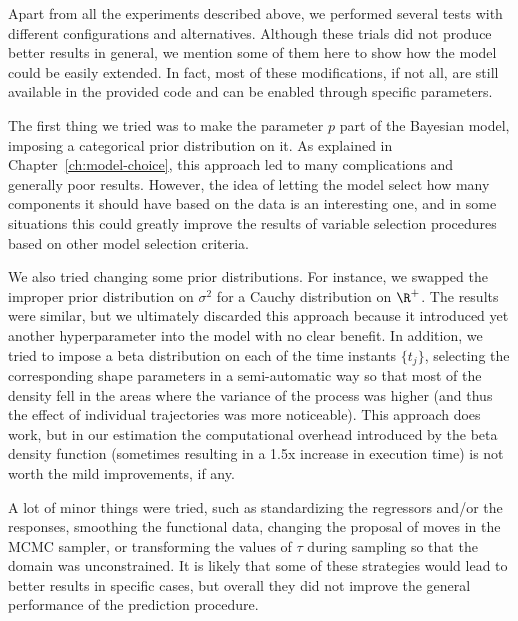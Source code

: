 Apart from all the experiments described above, we performed several tests with different configurations and alternatives. Although these trials did not produce better results in general, we mention some of them here to show how the model could be easily extended. In fact, most of these modifications, if not all, are still available in the provided code and can be enabled through specific parameters.

The first thing we tried was to make the parameter \(p\) part of the Bayesian model, imposing a categorical prior distribution on it. As explained in Chapter~\ref{ch:model-choice}, this approach led to many complications and generally poor results. However, the idea of letting the model select how many components it should have based on the data is an interesting one, and in some situations this could greatly improve the results of variable selection procedures based on other model selection criteria.

We also tried changing some prior distributions. For instance, we swapped the improper prior distribution on \(\sigma^2\) for a Cauchy distribution on \(\R^+\). The results were similar, but we ultimately discarded this approach because it introduced yet another hyperparameter into the model with no clear benefit. In addition, we tried to impose a beta distribution on each of the time instants \(\{t_j\}\), selecting the corresponding shape parameters in a semi-automatic way so that most of the density fell in the areas where the variance of the process was higher (and thus the effect of individual trajectories was more noticeable). This approach does work, but in our estimation the computational overhead introduced by the beta density function (sometimes resulting in a 1.5x increase in execution time) is not worth the mild improvements, if any.

A lot of minor things were tried, such as standardizing the regressors and/or the responses, smoothing the functional data, changing the proposal of moves in the MCMC sampler, or transforming the values of \(\tau\) during sampling so that the domain was unconstrained. It is likely that some of these strategies would lead to better results in specific cases, but overall they did not improve the general performance of the prediction procedure.
